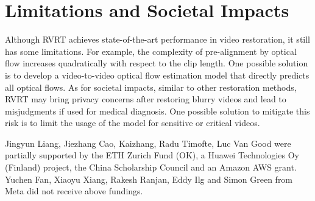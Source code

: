 \documentclass{article}
\newlength \g
\begin{document}
\section{Limitations and Societal Impacts}
\label{sec:limitation}
Although RVRT achieves state-of-the-art performance in video restoration, it still has some limitations. For example, the complexity of pre-alignment by optical flow increases quadratically with respect to the clip length. One possible solution is to develop a video-to-video optical flow estimation model that directly predicts all optical flows. As for societal impacts, similar to other restoration methods, RVRT may bring privacy concerns after restoring blurry videos and lead to misjudgments if used for medical diagnosis. One possible solution to mitigate this risk is to limit the usage of the model for sensitive or critical videos.























\begin{ack}
Jingyun Liang, Jiezhang Cao, Kaizhang, Radu Timofte, Luc Van Good were partially supported by the ETH Zurich Fund (OK), a Huawei Technologies Oy (Finland) project, the China Scholarship Council and an Amazon AWS grant. Yuchen Fan, Xiaoyu Xiang, Rakesh Ranjan, Eddy Ilg and Simon Green from Meta did not receive above fundings.
\end{ack}




\end{document}
